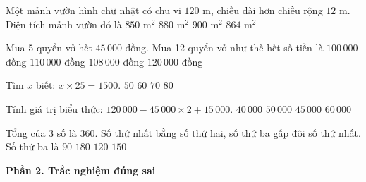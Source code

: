 \begin{ex} %
Một mảnh vườn hình chữ nhật có chu vi $120\text{ m}$, chiều dài hơn chiều rộng $12\text{ m}$. Diện tích mảnh vườn đó là
\choice
{$850\text{ m}^2$}
{$880\text{ m}^2$}
{$900\text{ m}^2$}
{\True $864\text{ m}^2$}
\end{ex}

\begin{ex} %
Mua 5 quyển vở hết $45\,000$ đồng. Mua 12 quyển vở như thế hết số tiền là
\choice
{$100\,000$ đồng}
{$110\,000$ đồng}
{\True $108\,000$ đồng}
{$120\,000$ đồng}
\end{ex}

\begin{ex} %
Tìm $x$ biết: $x \times 25 = 1500$.
\choice
{$50$}
{\True $60$}
{$70$}
{$80$}
\end{ex}

\begin{ex} %
Tính giá trị biểu thức: $120\,000 - 45\,000 \times 2 + 15\,000$.
\choice
{$40\,000$}
{$50\,000$}
{\True $45\,000$}
{$60\,000$}
\end{ex}

\begin{ex} %
Tổng của 3 số là $360$. Số thứ nhất bằng số thứ hai, số thứ ba gấp đôi số thứ nhất. Số thứ ba là
\choice
{$90$}
{\True $180$}
{$120$}
{$150$}
\end{ex}

\textbf{Phần 2. Trắc nghiệm đúng sai}


